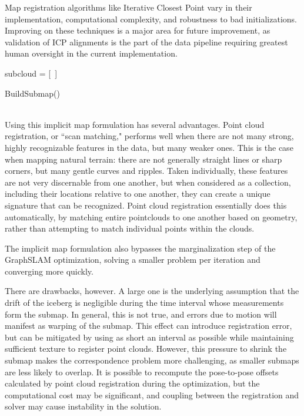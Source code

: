 Map registration algorithms like Iterative Closest Point vary in their implementation, computational complexity, and robustness to bad initializations. Improving on these techniques is a major area for future improvement, as validation of ICP alignments is the part of the data pipeline requiring greatest human oversight in the current implementation.\\


\begin{algorithm}[H]
\DontPrintSemicolon
\label{alg.submap}
\SetAlgoLined
{}
subcloud = [~] \;
\caption{BuildSubmap() \label{BSM}}
\end{algorithm}
~\\

Using this implicit map formulation has several advantages. Point cloud registration, or ``scan matching," performs well when there are not many strong, highly recognizable features in the data, but many weaker ones. This is the case when mapping natural terrain: there are not generally straight lines or sharp corners, but many gentle curves and ripples. Taken individually, these features are not very discernable from one another, but when considered as a collection, including their locations relative to one another, they can create a unique signature that can be recognized. Point cloud registration essentially does this automatically, by matching entire pointclouds to one another based on geometry, rather than attempting to match individual points within the clouds.

The implicit map formulation also bypasses the marginalization step of the GraphSLAM optimization, solving a smaller problem per iteration and converging more quickly. 

There are drawbacks, however. A large one is the underlying assumption that the drift of the iceberg is negligible during the time interval whose measurements form the submap. In general, this is not true, and errors due to motion will manifest as warping of the submap. This effect can introduce registration error, but can be mitigated by using as short an interval as possible while maintaining sufficient texture to register point clouds. However, this pressure to shrink the submap makes the correspondence problem more challenging, as smaller submaps are less likely to overlap. It is possible to recompute the pose-to-pose offsets calculated by point cloud registration during the optimization, but the computational cost may be significant, and coupling between the registration and solver may cause instability in the solution. 

